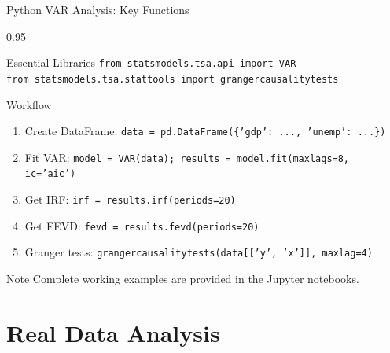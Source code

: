\documentclass[9pt, aspectratio=169, t]{beamer}
\begin{document}
\begin{frame}{Python VAR Analysis: Key Functions}
    \begin{cminipage}{0.95\textwidth}
    {\footnotesize
    \begin{block}{Essential Libraries}
        \texttt{from statsmodels.tsa.api import VAR} \\
        \texttt{from statsmodels.tsa.stattools import grangercausalitytests}
    \end{block}

    \begin{block}{Workflow}
        \begin{enumerate}\setlength{\itemsep}{0pt}
            \item Create DataFrame: \texttt{data = pd.DataFrame(\{'gdp': ..., 'unemp': ...\})}
            \item Fit VAR: \texttt{model = VAR(data); results = model.fit(maxlags=8, ic='aic')}
            \item Get IRF: \texttt{irf = results.irf(periods=20)}
            \item Get FEVD: \texttt{fevd = results.fevd(periods=20)}
            \item Granger tests: \texttt{grangercausalitytests(data[['y', 'x']], maxlag=4)}
        \end{enumerate}
    \end{block}

    \begin{alertblock}{Note}
        Complete working examples are provided in the Jupyter notebooks.
    \end{alertblock}
    }
    \end{cminipage}
\end{frame}

\section{Real Data Analysis}
\end{document}
